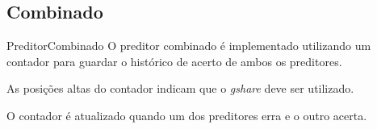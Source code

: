 \documentclass{beamer}
\begin{document}
\subsection{Combinado}

\begin{frame}{Preditor}{Combinado}
	O preditor combinado é implementado utilizando um contador para guardar o
	histórico de acerto de ambos os preditores.

	\vfill

	As posições altas do contador indicam que o \textit{gshare} deve ser
	utilizado.

	\vfill

	O contador é atualizado quando um dos preditores erra e o outro acerta.
\end{frame}
\end{document}
